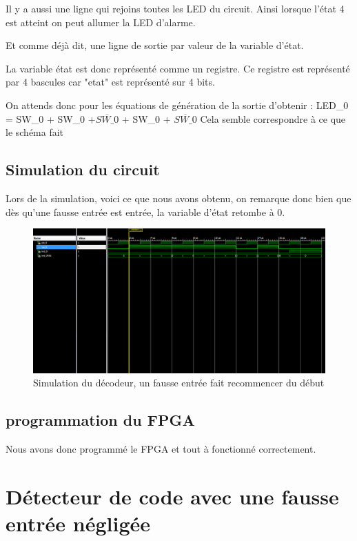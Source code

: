 \documentclass[11pt]{report}
\begin{document}
Il y a aussi une ligne qui rejoins toutes les LED du circuit. Ainsi lorsque l'état 4 est atteint on peut allumer la LED d'alarme. 

Et comme déjà dit, une ligne de sortie par valeur de la variable d'état.


La variable état est donc représenté comme un registre. Ce registre est représenté par 4 bascules car "etat" est représenté sur 4 bits. 

  
  
  
 On attends donc pour les équations de génération de la sortie d'obtenir :
 LED\_0 = SW\_0 + SW\_0 +$\overline{ SW\_0}$ + SW\_0 + $\overline{ SW\_0}$
Cela semble correspondre à ce que le schéma fait
  
  
 
  \subsection{ Simulation du circuit}
 
Lors de la simulation, voici ce que nous avons obtenu, on remarque donc bien que dès qu'une fausse entrée est entrée, la variable d'état retombe à 0. 

\begin{figure}[!h]
\includegraphics[width=15cm]{TP02-7.PNG}
\caption{Simulation du décodeur, un fausse entrée fait recommencer du début}
\end{figure}
  
  
   \subsection{ programmation du FPGA}

Nous avons donc programmé le FPGA et tout à fonctionné correctement. 

\section{Détecteur de code avec une fausse entrée négligée}
\end{document}
